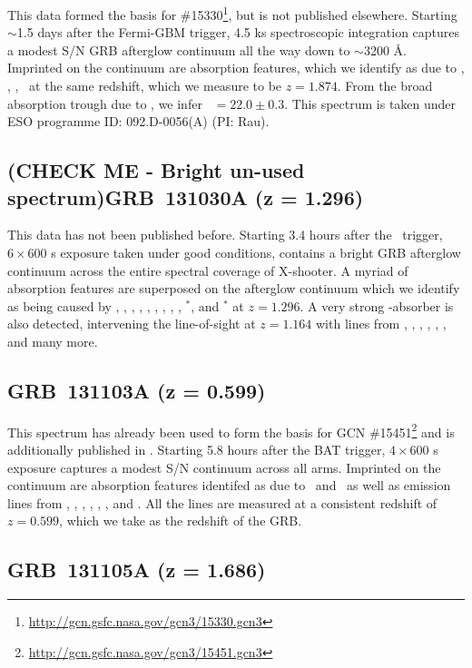 \documentclass{aa}    %
\begin{document}
This data formed the basis for
\#15330\footnote{\url{http://gcn.gsfc.nasa.gov/gcn3/15330.gcn3}}, but is not
published elsewhere. Starting $\sim$1.5 days after the Fermi-GBM trigger, 4.5 ks
spectroscopic integration captures a modest S/N GRB afterglow continuum all the
way down to $\sim$3200 \AA. Imprinted on the continuum are absorption features,
which we identify as due to \lya, \feii,  \mgii, \mgi~at the same redshift,
which we measure to be $z = 1.874$. From the broad absorption trough due to
\lya, we infer \nh~$= 22.0 \pm 0.3$. This spectrum is taken under ESO programme
ID: 092.D-0056(A) (PI: Rau).

\subsection{(CHECK ME - Bright un-used spectrum)GRB~131030A (z = 1.296)}	

This data has not been published before. Starting 3.4 hours after the
\swift~trigger, $6\times600$ s exposure taken under good conditions, contains a
bright GRB afterglow continuum across the entire spectral coverage of X-shooter.
A myriad of absorption features are superposed on the afterglow continuum which
we identify as being caused by \SIiv, \SIii, \civ, \alii, \aliii, \znii, \crii,
\NIii, \feii, \NIii$^*$, and \feii$^*$ at $z = 1.296$. A very strong
\mgii-absorber is also detected, intervening the line-of-sight at $z = 1.164$
with lines from \SIii, \civ, \aliii, \aliii, \feii, \mnii, and many more.

\subsection{GRB~131103A (z = 0.599)}	

This spectrum has already been used to form the basis for GCN
\#15451\footnote{\url{http://gcn.gsfc.nasa.gov/gcn3/15451.gcn3}} and is
additionally published in \citet{Kruhler2015}. Starting 5.8 hours after the BAT
trigger, $4\times600$ s exposure captures a modest S/N continuum across all
arms. Imprinted on the continuum are absorption features identifed as due to
\feii~and \mgii~as well as emission lines from \oii, \hd, \hg, \hb, \oiii, \ha,
and \nii. All the lines are measured at a consistent redshift of $z = 0.599$,
which we take as the redshift of the GRB.

\subsection{GRB~131105A (z = 1.686)}	
\end{document}
